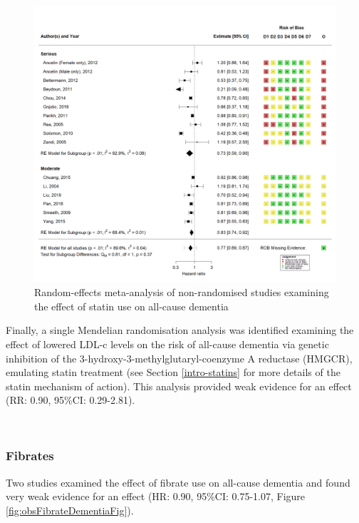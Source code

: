 \documentclass[a4paper, twoside]{templates/ociamthesis}
\begin{document}
\begin{figure}[H]
\includegraphics[width=1\linewidth]{figures/sys-rev/fp_obs_Statin-Ever_Dementia} \caption[Random-effects meta-analysis of statins on all-cause dementia]{Random-effects meta-analysis of non-randomised studies examining the effect of statin use on all-cause dementia}\label{fig:obsStatinDementiaFig}
\end{figure}

Finally, a single Mendelian randomisation analysis was identified examining the effect of lowered LDL-c levels on the risk of all-cause dementia via genetic inhibition of the 3-hydroxy-3-methylglutaryl-coenzyme A reductase (HMGCR), emulating statin treatment (see Section \ref{intro-statins} for more details of the statin mechanism of action). This analysis provided weak evidence for an effect (RR: 0.90, 95\%CI: 0.29-2.81).

~

\hypertarget{fibrates}{%
\subsubsection{Fibrates}\label{fibrates}}

Two studies examined the effect of fibrate use on all-cause dementia and found very weak evidence for an effect (HR: 0.90, 95\%CI: 0.75-1.07, Figure \ref{fig:obsFibrateDementiaFig}).
\end{document}
